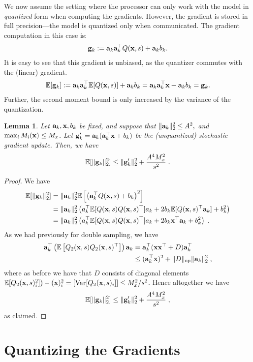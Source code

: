 \documentclass{article}
\def\a{{\bf a}}
\def\g{{\bf g}}
\def\x{{\bf x}}
\def\E{\mathbb{E}}
\newtheorem{lemma}{Lemma}
\begin{document}
We now assume the setting where the processor can only work with the model in \emph{quantized} form when computing the gradients. 
However, the gradient is stored in full precision---the model is quantized only when communicated. 
The gradient computation in this case is:
\begin{equation}
\label{eqn:leastsquares-2}
\g_k := \a_k \a_k^\top Q( \x , s) + \a_k b_k.
\end{equation}
It is easy to see that this gradient is unbiased, as the quantizer commutes with the (linear) gradient. 
\[
\E[ \g_k ]  := \a_k \a_k^\top \E [ Q( \x, s ) ]  + \a_k b_k = \a_k \a_k^\top \x   + \a_k b_k = \g_k .
\]
Further, the second moment bound is only increased by the variance of the quantization. 

\begin{lemma}
    \label{lem:model-quantization}
    Let $\a_k, \x, b_k$ be fixed, and suppose that $\| \a_k \|_2^2 \leq A^2,$ and $\max_i M_i (\x) \leq M_x$.
    Let $\g'_k = \a_k (\a_k^\top \x + b_k)$ be the (unquantized) stochastic gradient update.
    Then, we have
    \[
    \E [\| \g_k \|_2^2] \leq \| \g'_k \|_2^2 + \frac{A^4 M_x^2}{s^2} \; .
    \]
\end{lemma}
\begin{proof}
We have
\begin{align*}
    \E [\| \g_k \|_2^2] &= \| \a_k \|_2^2 \E \left[\left( \a_k^\top Q( \x, s)  + b_k \right)^2 \right] \\
    &= \| \a_k \|_2^2 \left( a_k^\top \E[Q(\x, s) Q(\x, s)^\top] a_k + 2 b_k \E[Q(\x, s)^\top \a_k] + b_k^2 \right) \\
    &= \| \a_k \|_2^2 \left( a_k^\top \E[Q(\x, s) Q(\x, s)^\top] a_k + 2 b_k \x^\top \a_k + b_k^2 \right) \; .
\end{align*}
As we had previously for double sampling, we have
\begin{align*}
    \a_k^\top \left( \E \left[ Q_2 (\x, s) Q_2 (\x, s)^\top \right] \right) \a_k &= \a_k^\top (\x \x^\top + D) \a_k^\top \\
    &\leq (\a_k^\top \x)^2 + \| D \|_{\mathrm{op}} \| \a_k \|_2^2 \; ,
\end{align*}
where as before we have that $D$ consists of diagonal elements $\E[Q_2 (\x, s)_i^2]) - (\x)_i^2 = [\mathrm{Var} [Q_2 (\x, s)_i]] \leq M_x^2 / s^2$.
Hence altogether we have
\[
\E [\| \g_k \|_2^2] \leq \| \g'_k \|_2^2 + \frac{A^4 M_x^2}{s^2} \; ,
\]
as claimed.
\end{proof}


\section{Quantizing the Gradients}
\end{document}
